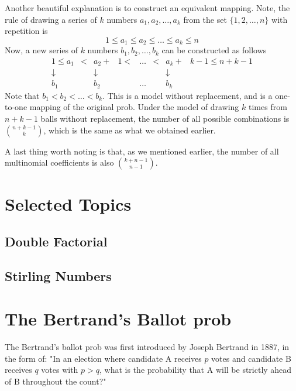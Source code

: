 Another beautiful explanation is to construct an equivalent mapping. Note, the rule of drawing a series of $k$ numbers $a_1, a_2, \ldots, a_k$ from the set $\{1,2,\ldots,n\}$ with repetition is
\begin{equation*}
	1 \le a_1 \le a_2 \le \ldots \le a_k \le n
\end{equation*}
Now, a new series of $k$ numbers $b_1, b_2, \ldots, b_k$ can be constructed as follows
\begin{equation*}
\begin{aligned}
	1 \le a_1 & < & a_2+&1 < & \ldots & <  & a_k+&k-1 \le n+k-1 \\
	\downarrow & & \downarrow & & & & \downarrow \\
	b_1 & & b_2 & & \ldots & & b_k
\end{aligned}	
\end{equation*}
Note that $b_1 < b_2 < \ldots < b_k$. This is a model without replacement, and is a one-to-one mapping of the original prob. Under the model of drawing $k$ times from $n+k-1$ balls without replacement, the number of all possible combinations is $n+k-1 \choose k$, which is the same as what we obtained earlier.

A last thing worth noting is that, as we mentioned earlier, the number of all multinomial coefficients is also $k+n-1 \choose n-1$.

\section{Selected Topics}
\subsection{Double Factorial}
\subsection{Stirling Numbers}

\section{The Bertrand's Ballot prob}\label{chapter: Bertrand_Ballot_prob}
The Bertrand's ballot prob was first introduced by Joseph Bertrand in 1887, in the form of: "In an election where candidate A receives $p$ votes and candidate B receives $q$ votes with $p>q$, what is the probability that A will be strictly ahead of B throughout the count?"

